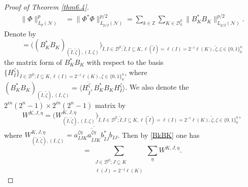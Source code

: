 \documentclass[oneside,english,a4wide]{amsart}
\numberwithin{equation}{section}
\numberwithin{figure}{section}
\theoremstyle{plain}
\theoremstyle{plain}
\theoremstyle{definition}
\theoremstyle{plain}
\theoremstyle{remark}
\theoremstyle{definition}
\theoremstyle{remark}
\theoremstyle{definition}
\newcommand{\8}{\infty}
\begin{document}
\begin{proof}[Proof of Theorem \ref{thm6.4}]
	\begin{equation}\label{Nf1}
		\begin{aligned}
			\|\varPhi\|_{L_p(\mathcal{N})}^p&=\|\varPhi^*\varPhi\|_{L_{p/2}(\mathcal{N})}^{p/2}
			=\sum_{k\in\mathbb{Z}}\sum_{K\in\mathcal{D}^0_k}\|B^*_KB_K\|_{L_{p/2}(\mathcal{N})}^{p/2}.
		\end{aligned}
	\end{equation}
Denote by 
\begin{equation*}
	[B_K^*B_K]=\biggl((B_K^*B_K)_{(\tilde{I},\tilde{\zeta}),(I,\zeta)}\biggr)_{\tilde{I},I\in \mathcal{D}^0;\tilde{I},I\subseteq K , \ell(\tilde{I})=\ell(I)=2^{-i}\ell(K), \tilde{\zeta},\zeta\in\{0,1\}^n_0}
\end{equation*}
the matrix form of $B_K^*B_K$ with respect to the basis $\{H_I^\zeta\}_{I\in\mathcal{D}^0;I\subseteq K , \ell(I)=2^{-i}\ell(K), \zeta\in\{0,1\}^n_0}$, where $(B_K^*B_K)_{(\tilde{I},\tilde{\zeta}),(I,\zeta)}=\langle  H_{\tilde{I}}^{\tilde{\zeta}},B_K^*B_K H_I^\zeta\rangle$. We also denote the  $2^{in}(2^n-1)\times 2^{in}(2^n-1)$ matrix by
\begin{equation}\label{W}
	W^{K,J,\eta}=\bigg(W_{(\tilde{I},\tilde{\zeta}),(I,\zeta)}^{K,J,\eta}\bigg)_{\tilde{I},I\in \mathcal{D}^0;\tilde{I},I\subseteq K , \ell(\tilde{I})=\ell(I)=2^{-i}\ell(K), \tilde{\zeta},\zeta\in\{0,1\}^n_0},
\end{equation}
where $W_{(\tilde{I},\tilde{\zeta}),(I,\zeta)}^{K,J,\eta}=a_{IJK}^{\zeta\eta}\overline{a_{\tilde{I}JK}^{\tilde{\zeta}\eta}}b_{\tilde{I}J}^* b_{IJ}$. Then by \eqref{BkBK} one has
\begin{equation*}
	[B_K^*B_K]=\sum_{\substack{J\in\mathcal{D}^0;J\subseteq K\\ \ell(J)=2^{-j}\ell(K)}}\sum_{\eta} W^{K,J,\eta}.
\end{equation*}


\end{proof}
\end{document}
